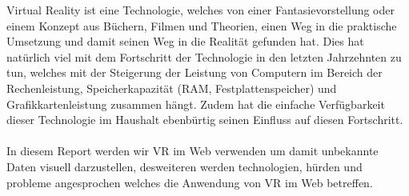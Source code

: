 
Virtual Reality ist eine Technologie, welches von einer Fantasievorstellung oder einem Konzept aus Büchern, Filmen und Theorien, einen Weg in
die praktische Umsetzung und damit seinen Weg in die Realität gefunden hat. Dies hat natürlich viel mit dem Fortschritt der Technologie in
den letzten Jahrzehnten zu tun, welches mit der Steigerung der Leistung von Computern im Bereich der Rechenleistung, Speicherkapazität (RAM,
Festplattenspeicher) und Grafikkartenleistung zusammen hängt. Zudem hat die einfache Verfügbarkeit dieser Technologie im Haushalt
ebenbürtig seinen Einfluss auf diesen Fortschritt. \\ \\
In diesem Report werden wir VR im Web verwenden um damit unbekannte Daten visuell darzustellen, desweiteren werden technologien, hürden und
probleme angesprochen welches die Anwendung von VR im Web betreffen.\\

